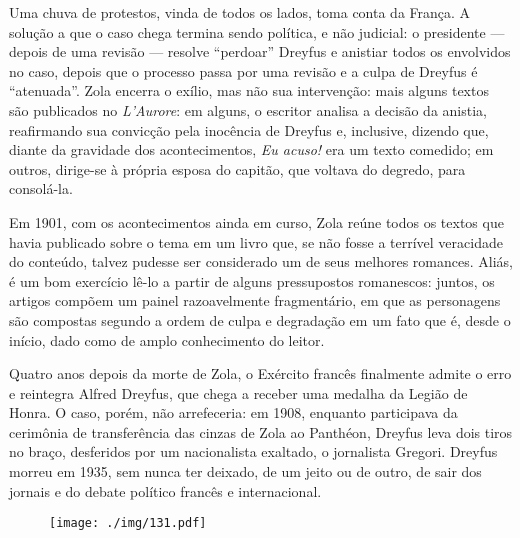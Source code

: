 Uma chuva de protestos, vinda de todos os lados, toma conta da França. A
solução a que o caso chega termina sendo política, e não judicial: o
presidente --- depois de uma revisão --- resolve “perdoar” Dreyfus e
anistiar todos os envolvidos no caso, depois que o processo passa por
uma revisão e a culpa de Dreyfus é “atenuada”. Zola encerra o exílio,
mas não sua intervenção: mais alguns textos são publicados no
\textit{L'Aurore}: em alguns, o escritor analisa a decisão da anistia,
reafirmando sua convicção pela inocência de Dreyfus e, inclusive,
dizendo que, diante da gravidade dos acontecimentos, \textit{Eu acuso!} era
um texto comedido; em outros, dirige-se à própria esposa do capitão,
que voltava do degredo, para consolá-la.

Em 1901, com os acontecimentos ainda em curso, Zola reúne todos os
textos que havia publicado sobre o tema em um livro que, se não fosse a
terrível veracidade do conteúdo, talvez pudesse ser considerado um de
seus melhores romances. Aliás, é um bom exercício lê-lo a partir de
alguns pressupostos romanescos: juntos, os artigos compõem um painel
razoavelmente fragmentário, em que as personagens são compostas segundo
a ordem de culpa e degradação em um fato que é, desde o início, dado
como de amplo conhecimento do leitor. 

Quatro anos depois da morte de Zola, o Exército francês finalmente
admite o erro e reintegra Alfred Dreyfus, que chega a receber uma
medalha da Legião de Honra. O caso, porém, não arrefeceria: em 1908,
enquanto participava da cerimônia de transferência das cinzas de Zola
ao Panthéon, Dreyfus leva dois tiros no braço, desferidos por um nacionalista exaltado, 
o jornalista Gregori. Dreyfus morreu em 1935, sem nunca ter deixado, de um jeito ou de
outro, de sair dos jornais e do debate político francês e internacional.
\asterisc

\begin{figure}
\centering
\texttt{[image: ./img/131.pdf]}
\end{figure}


